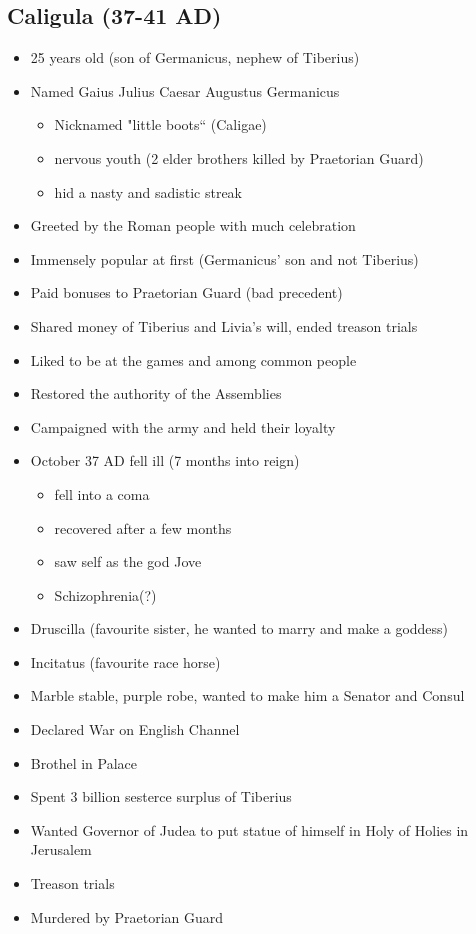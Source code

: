 \documentclass[12pt, twoside]{article}
\begin{document}
\subsection{Caligula (37-41 AD)}
\begin{itemize}
\item 25 years old (son of Germanicus, nephew of Tiberius)
\item Named Gaius Julius Caesar Augustus Germanicus
	\begin{itemize}
	\item Nicknamed "little boots“ (Caligae)
	\item nervous youth (2 elder brothers killed by Praetorian Guard)
	\item hid a nasty and sadistic streak
	\end{itemize}
\item Greeted by the Roman people with much celebration
\item Immensely popular at first (Germanicus’ son and not Tiberius)
\item Paid bonuses to Praetorian Guard (bad precedent)
\item Shared money of Tiberius and Livia’s will, ended treason trials
\item Liked to be at the games and among common people
\item Restored the authority of the Assemblies
\item Campaigned with the army and held their loyalty
\item October 37 AD fell ill (7 months into reign)
	\begin{itemize}
	\item fell into a coma
	\item recovered after a few months
	\item saw self as the god Jove
	\item Schizophrenia(?)
	\end{itemize}
\item Druscilla (favourite sister, he wanted to marry and make a goddess)
\item Incitatus (favourite race horse)
\item Marble stable, purple robe, wanted to make him a Senator and Consul
\item Declared War on English Channel
\item Brothel in Palace
\item Spent 3 billion sesterce surplus of Tiberius
\item Wanted Governor of Judea to put statue of himself in Holy of Holies in Jerusalem
\item Treason trials
\item Murdered by Praetorian Guard
\end{itemize}
\end{document}

